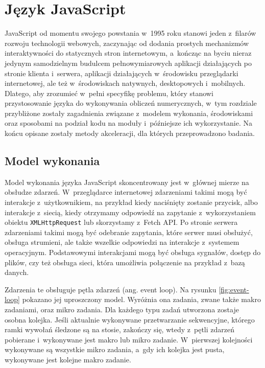 \chapter{Język JavaScript}

JavaScript od momentu swojego powstania w~1995 roku stanowi jeden z~filarów rozwoju technologii webowych, zaczynając od dodania prostych mechanizmów interaktywności do statycznych stron internetowym, a~kończąc na byciu nieraz jedynym samodzielnym budulcem pełnowymiarowych aplikacji działających po stronie klienta i~serwera, aplikacji działających w~środowisku przeglądarki internetowej, ale też w~środowiskach natywnych, desktopowych i~mobilnych. Dlatego, aby zrozumieć w~pełni specyfikę problemu, który stanowi przystosowanie języka do wykonywania obliczeń numerycznych, w~tym rozdziale przybliżone zostały zagadnienia związane z~modelem wykonania, środowiskami oraz sposobami na podział kodu na moduły i~późniejsze ich wykorzystanie. Na końcu opisane zostały metody akceleracji, dla których przeprowadzono badania.



\section{Model wykonania}

Model wykonania języka JavaScript skoncentrowany jest w~głównej mierze na obsłudze zdarzeń. W~przeglądarce internetowej zdarzeniami takimi mogą być interakcje z~użytkownikiem, na przykład kiedy naciśnięty zostanie przycisk, albo interakcje z~siecią, kiedy otrzymamy odpowiedź na zapytanie z~wykorzystaniem obiektu \lstinline{XMLHttpRequest} lub skorzystamy z~Fetch API. Po stronie serwera zdarzeniami takimi mogą być odebranie zapytania, które serwer musi obsłużyć, obsługa strumieni, ale także wszelkie odpowiedzi na interakcje z~systemem operacyjnym. Podstawowymi interakcjami mogą być obsługa sygnałów, dostęp do plików, czy też obsługa sieci, która umożliwia połączenie na przykład z~bazą danych.

Zdarzenia te obsługuje pętla zdarzeń (ang. event loop). Na rysunku \ref{fig:event-loop} pokazano jej uproszczony model. Wyróżnia ona zadania, zwane także makro zadaniami, oraz mikro zadania. Dla każdego typu zadań utworzona zostaje osobna kolejka. Jeśli aktualnie wykonywane przetwarzanie sekwencyjne, którego ramki wywołań śledzone są na stosie, zakończy się, wtedy z~pętli zdarzeń pobierane i~wykonywane jest makro lub mikro zadanie. W~pierwszej kolejności wykonywane są wszystkie mikro zadania, a~gdy ich kolejka jest pusta, wykonywane jest kolejne makro zadanie.

